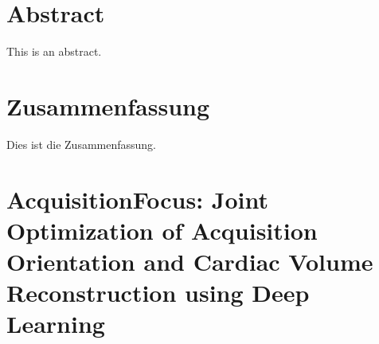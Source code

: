 \documentclass[
	11pt,
	a4paper,
	twoside,
	headsepline,
	titlepage,
	DIV=11,
	BCOR=12mm,
	captions=tableheading,
	chapterprefix=on,
	numbers=noenddot,
]{scrbook}
\begin{document}
    \thispagestyle{headings}
    

    \enlargethispage{1\baselineskip}
    \setcounter{page}{1}

    \chapter*{Abstract}
        This is an abstract.

    \chapter*{Zusammenfassung}
        Dies ist die Zusammenfassung.

    \cleardoublepage

    \tableofcontents
    \cleardoublepage

    
    
    \chapter{AcquisitionFocus: Joint Optimization of Acquisition Orientation and Cardiac Volume Reconstruction using Deep Learning}
        
    

    \printbibliography[heading=bibintoc]
\end{document}
